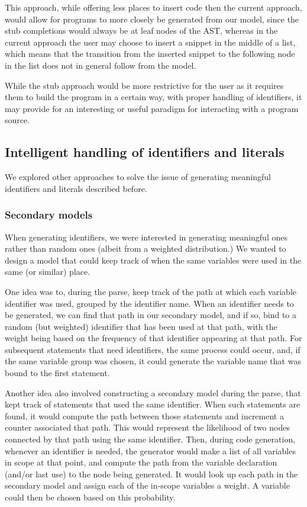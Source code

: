 \documentclass[titlepage]{article}
\begin{document}
This approach, while offering less places to insert code then the current
approach, would allow for programs to more closely be generated from our model,
since the stub completions would always be at leaf nodes of the AST, whereas in
the current approach the user may choose to insert a snippet in the middle of a
list, which means that the transition from the inserted snippet to the following
node in the list does not in general follow from the model.

While the stub approach would be more restrictive for the user as it requires
them to build the program in a certain way, with proper handling of identifiers,
it may provide for an interesting or useful paradigm for interacting with a program
source.

\subsection{Intelligent handling of identifiers and literals}

We explored other approaches to solve the issue of generating meaningful identifiers and literals described before.

\subsubsection{Secondary models}

When generating identifiers, we were interested in generating meaningful ones rather than random ones (albeit from a weighted distribution.) We wanted to design a model that could keep track of when the same variables were used in the same (or similar) place.

One idea was to, during the parse, keep track of the path at which each variable identifier was used, grouped by the identifier name. When an identifier needs to be generated, we can find that path in our secondary model, and if so, bind to a random (but weighted) identifier that has been used at that path, with the weight being based on the frequency of that identifier appearing at that path. For subsequent statements that need identifiers, the same process could occur, and, if the same variable group was chosen, it could generate the variable name that was bound to the first statement.

Another idea also involved constructing a secondary model during the parse, that kept track of statements that used the same identifier. When such statements are found, it would compute the path between those statements and increment a counter associated that path. This would represent the likelihood of two nodes connected by that path using the same identifier. Then, during code generation, whenever an identifier is needed, the generator would make a list of all variables in scope at that point, and compute the path from the variable declaration (and/or last use) to the node being generated. It would look up each path in the secondary model and assign each of the in-scope variables a weight. A variable could then be chosen based on this probability.
\end{document}
